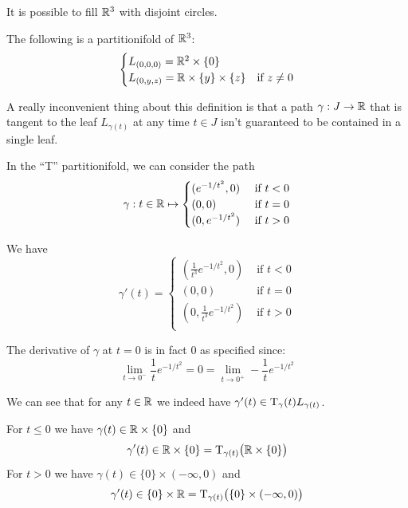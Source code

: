 	\begin{example}
		It is possible to fill $\mathbb{R}^3$ with disjoint circles. 
	\end{example}

    \begin{example}
        The following is a partitionifold of $\mathbb{R}^3$:
%
        \begin{align*}
            \begin{cases}
                L_{(0, 0, 0)} = \mathbb{R}^2 \times \{0\} \\
                L_{(0, y, z)} = \mathbb{R} \times \{y\} \times\{z\} &\text{if $z \neq 0$} 
            \end{cases}
        \end{align*}
    \end{example}

	A really inconvenient thing about this definition is that a path $\gamma : J \to \mathbb{R}$ that is tangent to the leaf $L_{\gamma(t)}$ at any time $t \in J$ isn't guaranteed to be contained in a single leaf.

	\begin{example}
		In the ``T'' partitionifold, we can consider the path
		$$
			\gamma: t \in \mathbb{R} \mapsto
			\begin{cases}
				(e^{-1/t^2}, 0)  &\text{ if } t < 0 \\
				(0, 0)           &\text{ if } t = 0 \\
				(0, e^{-1/t^2})  &\text{ if } t > 0 \\
			\end{cases}
		$$

		We have
		$$
			\gamma'(t) =
			\begin{cases}
				(\frac{1}{t^3} e^{-1/t^2}, 0)  &\text{ if } t < 0 \\
				(0, 0)                         &\text{ if } t = 0 \\
				(0, \frac{1}{t^3} e^{-1/t^2})  &\text{ if } t > 0 \\
			\end{cases}
		$$
		
		The derivative of $\gamma$ at $t=0$ is in fact $0$ as specified since:
		$$
			\lim_{t \to 0^-} \frac{1}{t} e^{-1/t^2} = 0 = \lim_{t \to 0^+} -\frac{1}{t} e^{-1/t^2}
		$$

		We can see that for any $t \in \mathbb{R}$ we indeed have $\gamma'(t) \in \mathrm{T}_\gamma(t) L_{\gamma(t)}$.
        
		For $t \leq 0$ we have $\gamma(t) \in \mathbb{R} \times \{0\}$ and
		$$
			\gamma'(t) \in \mathbb{R} \times \{0\} = \mathrm{T}_{\gamma(t)}\big( \mathbb{R} \times \{0\} \big)
		$$
		For $t > 0$ we have $\gamma(t) \in \{0\} \times (-\infty, 0)$ and
		$$
			\gamma'(t) \in \{0\} \times \mathbb{R} = \mathrm{T}_{\gamma(t)}\big( \{0\} \times (-\infty, 0) \big)
		$$
	\end{example}

